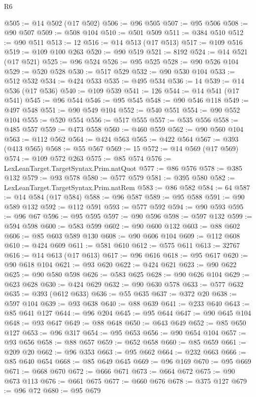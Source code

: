 \begin{lexlean}{R6}
\begin{coremodule}
@505 := @14 @502 (@17 @502)
@506 := @96 @505
@507 := @95 @506
@508 := @90 @507
@509 := @508 @104
@510 := @501 @509
@511 := @384 @510
@512 := @90 @511
@513 := 12
@516 := @14 @513 (@17 @513)
@517 := @109 @516
@519 := @109 @100 @263
@520 := @90 @519
@521 := 8192
@524 := @14 @521 (@17 @521)
@525 := @96 @524
@526 := @95 @525
@528 := @90 @526 @104
@529 := @520 @528
@530 := @517 @529
@532 := @90 @530 @104
@533 := @512 @532
@534 := @424 @533
@535 := @495 @534
@536 := 14
@539 := @14 @536 (@17 @536)
@540 := @109 @539
@541 := 126
@544 := @14 @541 (@17 @541)
@545 := @96 @544
@546 := @95 @545
@548 := @90 @546 @118
@549 := @497 @548
@551 := @90 @549 @104
@552 := @540 @551
@554 := @90 @552 @104
@555 := @520 @554
@556 := @517 @555
@557 := @535 @556
@558 := @485 @557
@559 := @473 @558
@560 := @460 @559
@562 := @90 @560 @104
@563 := @112 @562
@564 := @424 @563
@565 := @422 @564
@567 := @393 (@413 @565)
@568 := @55 @567
@569 := 15
@572 := @14 @569 (@17 @569)
@574 := @109 @572 @263
@575 := @85 @574
@576 := LexLeanTarget.TargetSyntax.Prim.natQuot
@577 := @86 @576
@578 := @385 @132
@579 := @93 @578
@580 := @577 @579
@581 := @395 @580
@582 := LexLeanTarget.TargetSyntax.Prim.natRem
@583 := @86 @582
@584 := 64
@587 := @14 @584 (@17 @584)
@588 := @96 @587
@589 := @95 @588
@591 := @90 @589 @132
@592 := @112 @591
@593 := @577 @592
@594 := @90 @593
@595 := @96 @67
@596 := @95 @595
@597 := @90 @596
@598 := @597 @132
@599 := @594 @598
@600 := @583 @599
@602 := @90 @600 @132
@603 := @88 @602
@606 := @85 @603 @589 @130
@608 := @90 @606 @104
@609 := @112 @608
@610 := @424 @609
@611 := @581 @610
@612 := @575 @611
@613 := 32767
@616 := @14 @613 (@17 @613)
@617 := @96 @616
@618 := @95 @617
@620 := @90 @618 @104
@621 := @93 @620
@622 := @424 @621
@623 := @90 @622
@625 := @90 @580 @598
@626 := @583 @625
@628 := @90 @626 @104
@629 := @623 @628
@630 := @424 @629
@632 := @90 @630 @578
@633 := @577 @632
@635 := @393 (@612 @633)
@636 := @55 @635
@637 := @372 @20
@638 := @597 @104
@639 := @93 @638
@640 := @88 @639
@641 := @233 @640
@643 := @85 @641 @127
@644 := @96 @204
@645 := @95 @644
@647 := @90 @645 @104
@648 := @93 @647
@649 := @88 @648
@650 := @643 @649
@652 := @85 @650 @127
@653 := @96 @317
@654 := @95 @653
@656 := @90 @654 @104
@657 := @93 @656
@658 := @88 @657
@659 := @652 @658
@660 := @85 @659
@661 := @209 @20
@662 := @96 @353
@663 := @95 @662
@664 := @232 @663
@666 := @85 @640 @654
@668 := @85 @649 @645
@669 := @96 @169
@670 := @95 @669
@671 := @668 @670
@672 := @666 @671
@673 := @664 @672
@675 := @90 @673 @113
@676 := @661 @675
@677 := @660 @676
@678 := @375 @127
@679 := @96 @72
@680 := @95 @679

\end{coremodule}
\end{lexlean}
